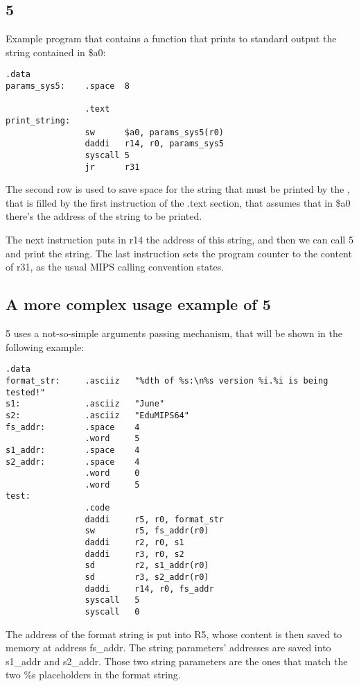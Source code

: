 \OF{}

\subsection{\SC{} 5}
Example program that contains a function that prints to standard output the
string contained in \$a0:
\begin{lstlisting}[caption={\SC{} 5 example}, label={code:syscall5}, style={mips}]
                .data
params_sys5:    .space  8

                .text
print_string:   
                sw      $a0, params_sys5(r0)    
                daddi   r14, r0, params_sys5
                syscall 5
                jr      r31
\end{lstlisting}
The second row is used to save space for the string that must be printed by the
\SC{}, that is filled by the first instruction of the .text section, that
assumes that in \$a0 there's the address of the string to be printed.

The next instruction puts in r14 the address of this string, and then we can
call \SC{} 5 and print the string. The last instruction sets the program counter
to the content of r31, as the usual MIPS calling convention states.

\subsection{A more complex usage example of \SC{} 5}
\SC{} 5 uses a not-so-simple arguments passing mechanism, that will be shown in
the following example:

\begin{lstlisting}[caption={More complex \SC{} 5 example}, label={code:printf}, style={mips}]
                .data
format_str:     .asciiz   "%dth of %s:\n%s version %i.%i is being tested!"
s1:             .asciiz   "June"
s2:             .asciiz   "EduMIPS64"
fs_addr:        .space    4
                .word     5    
s1_addr:        .space    4
s2_addr:        .space    4
                .word     0
                .word     5
test:
                .code
                daddi     r5, r0, format_str
                sw        r5, fs_addr(r0)
                daddi     r2, r0, s1
                daddi     r3, r0, s2
                sd        r2, s1_addr(r0)
                sd        r3, s2_addr(r0)
                daddi     r14, r0, fs_addr
                syscall   5
                syscall   0
\end{lstlisting}
The address of the format string is put into R5, whose content is then saved to
memory at address fs\_addr. The string parameters' addresses are saved into
s1\_addr and s2\_addr. Those two string parameters are the ones that match the
two \%s placeholders in the format string.

